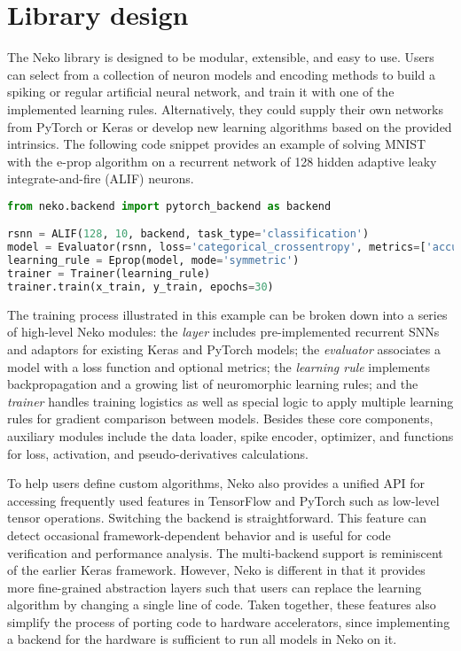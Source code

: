 \documentclass[sigconf,dvipsnames]{acmart}
\begin{document}
\section{Library design}
The Neko library is designed to be modular, extensible, and easy to use.
Users can select from a collection of neuron models and encoding methods to build a spiking or regular artificial neural network, and train it with one of the implemented learning rules.
Alternatively, they could supply their own networks from PyTorch or Keras \cite{chollet2015keras} or develop new learning algorithms based on the provided intrinsics.
The following code snippet provides an example of solving MNIST \cite{lecun1998mnist} with the e-prop algorithm on a recurrent network of 128 hidden adaptive leaky integrate-and-fire (ALIF) neurons.

\begin{lstlisting}[caption={Train an SNN model of ALIF neurons with e-prop. },captionpos=b,frame=single, language=python,breaklines]
from neko.backend import pytorch_backend as backend

rsnn = ALIF(128, 10, backend, task_type='classification')
model = Evaluator(rsnn, loss='categorical_crossentropy', metrics=['accuracy', 'firing_rate'])
learning_rule = Eprop(model, mode='symmetric')
trainer = Trainer(learning_rule)
trainer.train(x_train, y_train, epochs=30)
\end{lstlisting}

The training process illustrated in this example can be broken down into a series of high-level Neko modules:
the \emph{layer} includes pre-implemented recurrent SNNs and adaptors for existing Keras and PyTorch models;
the \emph{evaluator} associates a model with a loss function and optional metrics;
the \emph{learning rule} implements backpropagation and a growing list of neuromorphic learning rules;
and the \emph{trainer} handles training logistics as well as special logic to apply multiple learning rules for gradient comparison between models.
Besides these core components, auxiliary modules include the data loader, spike encoder, optimizer, and functions for loss, activation, and pseudo-derivatives calculations.

To help users define custom algorithms, Neko also provides a unified API for accessing frequently used features in TensorFlow and PyTorch such as low-level tensor operations.
Switching the backend is straightforward.
This feature can detect occasional framework-dependent behavior and is useful for code verification and performance analysis.
The multi-backend support is reminiscent of the earlier Keras framework.
However, Neko is different in that it provides more fine-grained abstraction layers such that users can replace the learning algorithm by changing a single line of code.
Taken together, these features also simplify the process of porting code to hardware accelerators, since implementing a backend for the hardware is sufficient to run all models in Neko on it.
\end{document}
